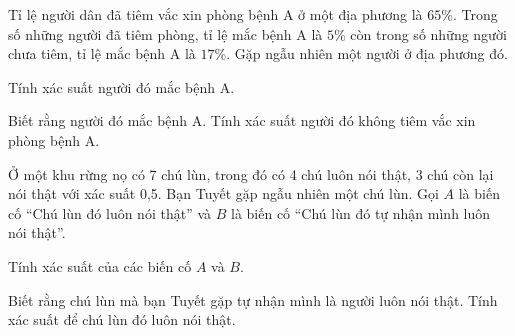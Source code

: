 \begin{bt}%
	Tỉ lệ người dân đã tiêm vắc xin phòng bệnh A ở một địa phương là $65\%$. Trong số những 
	người đã tiêm phòng, tỉ lệ mắc bệnh A là $5\%$ còn trong số những người chưa tiêm, tỉ lệ 
	mắc bệnh A là $17\%$. Gặp ngẫu nhiên một người ở địa phương đó.
	\begin{listEX}
	\item Tính xác suất người đó mắc bệnh A.
	\item Biết rằng người đó mắc bệnh A. Tính xác suất người đó không tiêm vắc xin phòng bệnh A.
	\end{listEX}
\end{bt}
\begin{bt}%
	Ở một khu rừng nọ có 7 chú lùn, trong đó có 4 chú luôn nói thật, 3 chú còn lại nói thật với 
	xác suất 0,5. Bạn Tuyết gặp ngẫu nhiên một chú lùn. Gọi $A$ là biến cố “Chú lùn đó luôn
	nói thật” và $B$ là biến cố “Chú lùn đó tự nhận mình luôn nói thật”.
	\begin{listEX}
	\item Tính xác suất của các biến cố $A$ và $B$.
	\item Biết rằng chú lùn mà bạn Tuyết gặp tự nhận mình là người luôn nói thật. Tính xác suất để 
	chú lùn đó luôn nói thật.
	\end{listEX}
\end{bt}
